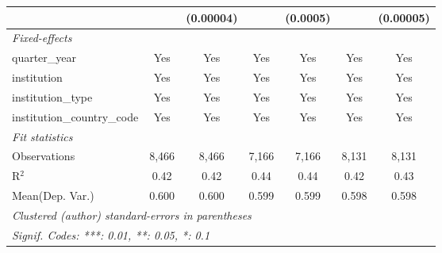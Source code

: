 \begin{tabular}{lcccccc}
                                      &               & (0.00004)     &              & (0.0005)     &              & (0.00005)\\   
   \midrule
   \emph{Fixed-effects}\\
   quarter\_year                      & Yes           & Yes           & Yes          & Yes          & Yes          & Yes\\  
   institution                        & Yes           & Yes           & Yes          & Yes          & Yes          & Yes\\  
   institution\_type                  & Yes           & Yes           & Yes          & Yes          & Yes          & Yes\\  
   institution\_country\_code         & Yes           & Yes           & Yes          & Yes          & Yes          & Yes\\  
   \midrule
   \emph{Fit statistics}\\
   Observations                       & 8,466         & 8,466         & 7,166        & 7,166        & 8,131        & 8,131\\  
   R$^2$                              & 0.42          & 0.42          & 0.44         & 0.44         & 0.42         & 0.43\\  
Mean(Dep. Var.) & 0.600 & 0.600 & 0.599 & 0.599 & 0.598 & 0.598 \\
   \midrule \midrule
   \multicolumn{7}{l}{\emph{Clustered (author) standard-errors in parentheses}}\\
   \multicolumn{7}{l}{\emph{Signif. Codes: ***: 0.01, **: 0.05, *: 0.1}}\\
\end{tabular}
\par\endgroup
